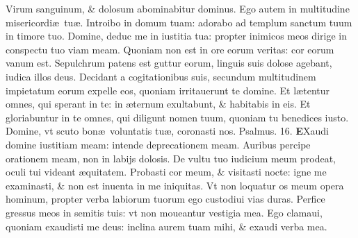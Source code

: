 \documentclass[a5paper,10pt]{book}
\def\ae{æ}
\begin{document}
\begin{multicols*}{2}
\newline \color{red} V\color{black}irum sanguinum, \& dolosum abominabitur dominus.
\newline \color{red} E\color{black}go autem in multitudine misericordi\ae \ tu\ae .
\newline \color{red} I\color{black}ntroibo in domum tuam: adorabo ad templum sanctum tuum in timore tuo.
\newline \color{red} D\color{black}omine, deduc me in iustitia tua: propter inimicos meos dirige in conspectu tuo viam meam.
\newline \color{red} Q\color{black}uoniam non est in ore eorum veritas: cor eorum vanum est.
\newline \color{red} S\color{black}epulchrum patens est guttur eorum, linguis suis dolose agebant, iudica illos deus.
\newline \color{red} D\color{black}ecidant a cogitationibus suis, secundum multitudinem impietatum eorum expelle eos, quoniam irritauerunt te domine.
\newline \color{red} E\color{black}t l\ae tentur omnes, qui sperant in te: in \ae ternum exultabunt, \& habitabis in eis.
\newline \color{red} E\color{black}t gloriabuntur in te omnes, qui diligunt nomen tuum, quoniam tu benedices iusto.
\newline \color{red} D\color{black}omine, vt scuto bon\ae \ voluntatis tu\ae , coronasti nos. \quad \color{red} Psalmus. 16.\color{black}
\vspace{-.5em}
\lettrine[lines=2]{\bfseries \color{red} E}{}Xaudi domine iustitiam meam: intende deprecationem meam.
\newline \color{red} A\color{black}uribus percipe orationem meam, non in labijs dolosis.
\newline \color{red} D\color{black}e vultu tuo iudicium meum prodeat, oculi tui videant \ae quitatem.%
\newline \color{red} P\color{black}robasti cor meum, \& visitasti nocte: igne me examinasti, \& non est inuenta in me iniquitas.
\newline \color{red} V\color{black}t non loquatur os meum opera hominum, propter verba labiorum tuorum ego custodiui vias duras.
\newline \color{red} P\color{black}erfice gressus meos in semitis tuis: vt non moueantur vestigia mea.
\newline \color{red} E\color{black}go clamaui, quoniam exaudisti me deus: inclina aurem tuam mihi, \& exaudi verba mea.

\end{multicols*}
\end{document}
